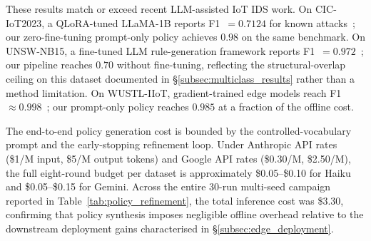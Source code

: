 These results match or exceed recent LLM-assisted IoT IDS work.
On CIC-IoT2023, a QLoRA-tuned LLaMA-1B reports F1~$=0.7124$ for known
attacks~\cite{lightweight_llm_iot_2025}; our zero-fine-tuning prompt-only
policy achieves $0.98$ on the same benchmark. On UNSW-NB15, a fine-tuned
LLM rule-generation framework reports F1~$=0.972$~\cite{rulemaster_2025};
our pipeline reaches $0.70$ without fine-tuning, reflecting the
structural-overlap ceiling on this dataset documented in
\S\ref{subsec:multiclass_results} rather than a method limitation. On
WUSTL-IIoT, gradient-trained edge models reach
F1~$\approx 0.998$~\cite{wustl_edge_2025}; our prompt-only policy reaches
$0.985$ at a fraction of the offline cost.

The end-to-end policy generation cost is bounded by the controlled-vocabulary
prompt and the early-stopping refinement loop. Under Anthropic API rates
(\$1/M input, \$5/M output tokens) and Google API rates (\$0.30/M, \$2.50/M),
the full eight-round budget per dataset is approximately \$0.05--\$0.10 for
Haiku and \$0.05--\$0.15 for Gemini. Across the entire 30-run multi-seed
campaign reported in Table~\ref{tab:policy_refinement}, the total inference
cost was \$3.30, confirming that policy synthesis imposes negligible offline
overhead relative to the downstream deployment gains characterised in
\S\ref{subsec:edge_deployment}.


